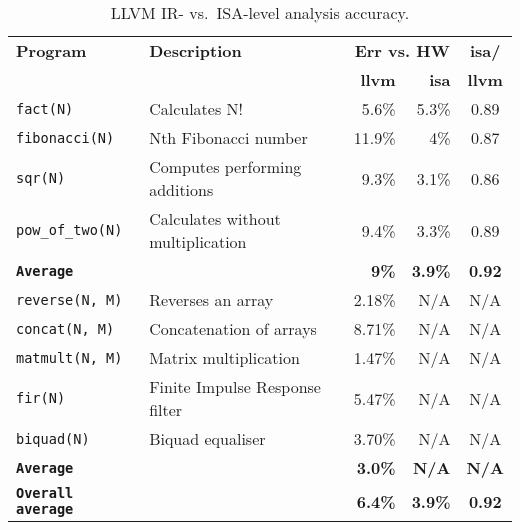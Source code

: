 \documentclass{llncs}
\newcommand{\level}{level\xspace}
\newcommand{\llvmir}{LLVM IR\xspace}
\newcommand{\tabend}{\vspace*{-5mm}}
\begin{document}
\begin{table}[ht]
\centering


\begin{tabular}{|l|l|r|r|c|}
\hline 
\textbf{Program} &\textbf{Description} & \multicolumn{2}{c|}{\textbf{Err vs. HW}} & \textbf{isa/}
\\  \cline{3-4}
&&\textbf{llvm}&\textbf{isa}&\textbf{llvm}
\\ \hline \hline 

\texttt{fact(N)}  &  Calculates N!      & 5.6\% & 5.3\% & 0.89
\\  \hline 
\texttt{fibonacci(N)}  &   Nth Fibonacci number   & 11.9\%& 4\%& 0.87
\\ \hline 
\texttt{sqr(N)}     &     Computes  performing additions    & 9.3\%&3.1\% & 0.86
\\ \hline 
\texttt{pow\_of\_two(N)}   &   Calculates  without multiplication & 9.4\% &3.3\% & 0.89
\\ \hline 
\texttt{\textbf{Average}} & & \textbf{9\%} & \textbf{3.9\%} & \textbf{0.92}
\\ \hline \hline
\texttt{reverse(N, M)} &  Reverses an array  & 2.18\%& N/A& N/A
\\ \hline 
\texttt{concat(N, M)}  &  Concatenation of arrays   &8.71\%&N/A& N/A
\\ \hline 
\texttt{matmult(N, M)}  &  Matrix multiplication  & 1.47\% & N/A & N/A
\\ \hline 
\texttt{fir(N)} & Finite Impulse Response filter & 5.47\% & N/A & N/A
\\ 
\hline
\texttt{biquad(N)} & Biquad equaliser & 3.70\% & N/A & N/A
\\ 
\hline 
\texttt{\textbf{Average}} & & \textbf{3.0\%} & \textbf{N/A} & \textbf{N/A}
\\ \hline
\hline 
\texttt{\textbf{Overall average}} & & \textbf{6.4\%} & \textbf{3.9\%} & \textbf{0.92}
\\ \hline
\end{tabular}
\caption{\llvmir- vs.\ ISA-\level analysis accuracy.}
\label{tab:isa-llvm-comparison}
\tabend
\tabend
\end{table}
\end{document}
